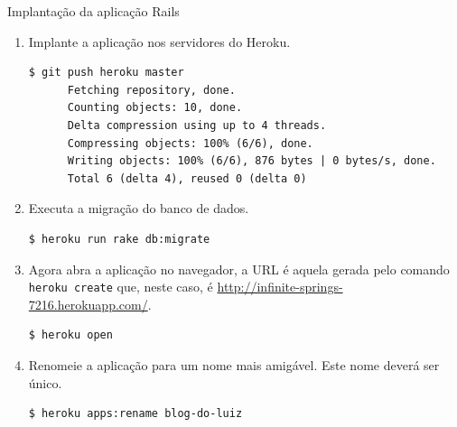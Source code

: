 \begin{frame}{Implantação da aplicação Rails}
\begin{enumerate}
    \item Implante a aplicação nos servidores do Heroku.
    \begin{lstlisting}[style=BashInputStyle]
      $ git push heroku master
      Fetching repository, done.
      Counting objects: 10, done.
      Delta compression using up to 4 threads.
      Compressing objects: 100% (6/6), done.
      Writing objects: 100% (6/6), 876 bytes | 0 bytes/s, done.
      Total 6 (delta 4), reused 0 (delta 0)
    \end{lstlisting}
     
    \item Executa a migração do banco de dados.
    \begin{lstlisting}[style=BashInputStyle]
			$ heroku run rake db:migrate
    \end{lstlisting}
    
    \item Agora abra a aplicação no navegador, a URL é aquela gerada pelo comando
      \verb!heroku create! que, neste caso, é \url{http://infinite-springs-7216.herokuapp.com/}.
    \begin{lstlisting}[style=BashInputStyle]
      $ heroku open
    \end{lstlisting}
    
    \item Renomeie a aplicação para um nome mais amigável. Este nome deverá ser único.
    \begin{lstlisting}[style=BashInputStyle]
      $ heroku apps:rename blog-do-luiz
    \end{lstlisting}
        
  \end{enumerate}
\end{frame}

